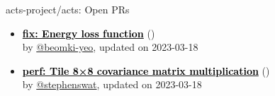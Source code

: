 \begin{frame}[allowframebreaks]{ acts-project/acts: Open PRs
}
\begin{itemize}
    \item\iss\prstale\textbf{\href{https://github.com/acts-project/acts/pull/1323}{\textcolor{black}{fix: Energy loss function}}}
    (\href{https://github.com/acts-project/acts/pull/1323}{}) \\
    by \href{https://github.com/beomki-yeo}{@beomki-yeo}, updated on 2023-03-18

    \item\iss\prstale\textbf{\href{https://github.com/acts-project/acts/pull/1181}{\textcolor{black}{perf: Tile 8×8 covariance matrix multiplication}}}
    (\href{https://github.com/acts-project/acts/pull/1181}{}) \\
    by \href{https://github.com/stephenswat}{@stephenswat}, updated on 2023-03-18

    
  \end{itemize}

\end{frame}







